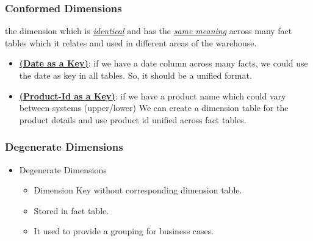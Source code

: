 \begin{frame}
    \frametitle{Conformed Dimensions}
    \begin{description}[<+->]
        \item[Conformed Dimensions]    the dimension which is \underline{\textit{identical}} and has the \underline{\textit{same meaning}} across many fact tables which it relates and used in different areas of the warehouse.
        \begin{example}
            \begin{itemize}[<+->]
                \item \underline{\textbf{(Date as a Key)}}: if we have a date column across many facts, we could use the date as key in all tables. So, it should be a unified format.
                \item \underline{\textbf{(Product-Id as a Key)}}: if we have a product name which could vary between systems
                \forexample (upper/lower) We can create a dimension table for the product details and use product id unified across fact tables.
            \end{itemize}
        \end{example}
    \end{description}
\end{frame}
\begin{frame}
	\frametitle{Degenerate Dimensions}
	\begin{itemize}[<+->]
		\item Degenerate Dimensions
		\begin{itemize}[<+->]
			\item Dimension Key without corresponding dimension table.%
			\item Stored in fact table.
			\item It used to provide a grouping for business cases.
		\end{itemize}
	\end{itemize}
\end{frame}
